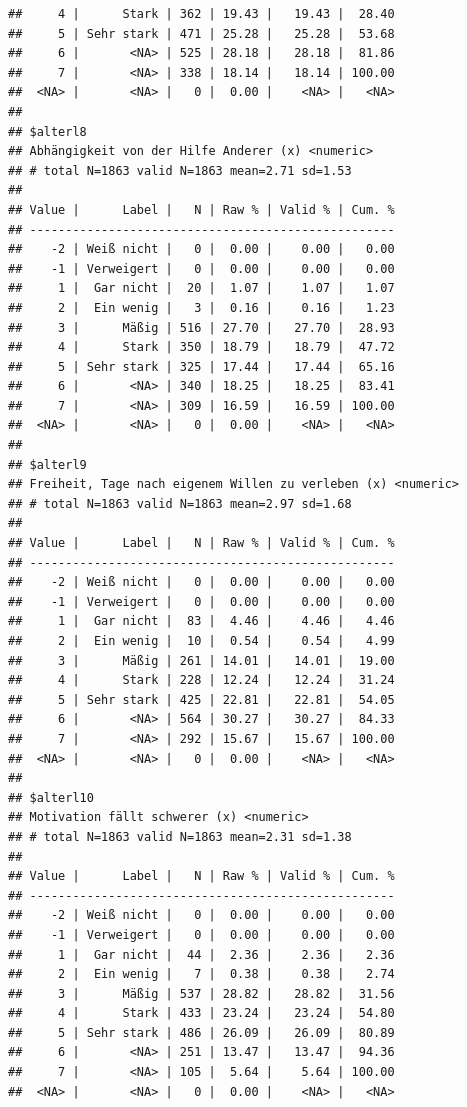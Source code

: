 \documentclass[
  doc]{apa6}
\begin{document}
\begin{verbatim}
##     4 |      Stark | 362 | 19.43 |   19.43 |  28.40
##     5 | Sehr stark | 471 | 25.28 |   25.28 |  53.68
##     6 |       <NA> | 525 | 28.18 |   28.18 |  81.86
##     7 |       <NA> | 338 | 18.14 |   18.14 | 100.00
##  <NA> |       <NA> |   0 |  0.00 |    <NA> |   <NA>
## 
## $alterl8
## Abhängigkeit von der Hilfe Anderer (x) <numeric> 
## # total N=1863 valid N=1863 mean=2.71 sd=1.53
## 
## Value |      Label |   N | Raw % | Valid % | Cum. %
## ---------------------------------------------------
##    -2 | Weiß nicht |   0 |  0.00 |    0.00 |   0.00
##    -1 | Verweigert |   0 |  0.00 |    0.00 |   0.00
##     1 |  Gar nicht |  20 |  1.07 |    1.07 |   1.07
##     2 |  Ein wenig |   3 |  0.16 |    0.16 |   1.23
##     3 |      Mäßig | 516 | 27.70 |   27.70 |  28.93
##     4 |      Stark | 350 | 18.79 |   18.79 |  47.72
##     5 | Sehr stark | 325 | 17.44 |   17.44 |  65.16
##     6 |       <NA> | 340 | 18.25 |   18.25 |  83.41
##     7 |       <NA> | 309 | 16.59 |   16.59 | 100.00
##  <NA> |       <NA> |   0 |  0.00 |    <NA> |   <NA>
## 
## $alterl9
## Freiheit, Tage nach eigenem Willen zu verleben (x) <numeric> 
## # total N=1863 valid N=1863 mean=2.97 sd=1.68
## 
## Value |      Label |   N | Raw % | Valid % | Cum. %
## ---------------------------------------------------
##    -2 | Weiß nicht |   0 |  0.00 |    0.00 |   0.00
##    -1 | Verweigert |   0 |  0.00 |    0.00 |   0.00
##     1 |  Gar nicht |  83 |  4.46 |    4.46 |   4.46
##     2 |  Ein wenig |  10 |  0.54 |    0.54 |   4.99
##     3 |      Mäßig | 261 | 14.01 |   14.01 |  19.00
##     4 |      Stark | 228 | 12.24 |   12.24 |  31.24
##     5 | Sehr stark | 425 | 22.81 |   22.81 |  54.05
##     6 |       <NA> | 564 | 30.27 |   30.27 |  84.33
##     7 |       <NA> | 292 | 15.67 |   15.67 | 100.00
##  <NA> |       <NA> |   0 |  0.00 |    <NA> |   <NA>
## 
## $alterl10
## Motivation fällt schwerer (x) <numeric> 
## # total N=1863 valid N=1863 mean=2.31 sd=1.38
## 
## Value |      Label |   N | Raw % | Valid % | Cum. %
## ---------------------------------------------------
##    -2 | Weiß nicht |   0 |  0.00 |    0.00 |   0.00
##    -1 | Verweigert |   0 |  0.00 |    0.00 |   0.00
##     1 |  Gar nicht |  44 |  2.36 |    2.36 |   2.36
##     2 |  Ein wenig |   7 |  0.38 |    0.38 |   2.74
##     3 |      Mäßig | 537 | 28.82 |   28.82 |  31.56
##     4 |      Stark | 433 | 23.24 |   23.24 |  54.80
##     5 | Sehr stark | 486 | 26.09 |   26.09 |  80.89
##     6 |       <NA> | 251 | 13.47 |   13.47 |  94.36
##     7 |       <NA> | 105 |  5.64 |    5.64 | 100.00
##  <NA> |       <NA> |   0 |  0.00 |    <NA> |   <NA>
\end{verbatim}
\end{document}
